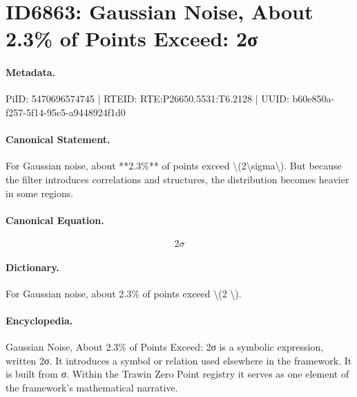 \section*{ID6863: Gaussian Noise, About 2.3\% of Points Exceed: 2σ}
\paragraph{Metadata.}
PiID: 5470696574745 | RTEID: RTE:P26650.5531:T6.2128 | UUID: b60e850a-f257-5f14-95c5-a9448924f1d0

\paragraph{Canonical Statement.}
For Gaussian noise, about **2.3\%** of points exceed \textbackslash{}(2\textbackslash{}sigma\textbackslash{}). But because the filter introduces correlations and structures, the distribution becomes heavier in some regions.

\paragraph{Canonical Equation.}
\[
2\sigma
\]

\paragraph{Dictionary.}
For Gaussian noise, about 2.3\% of points exceed \textbackslash{}(2 \textbackslash{}).

\paragraph{Encyclopedia.}
Gaussian Noise, About 2.3\% of Points Exceed: 2σ is a symbolic expression, written 2σ. It introduces a symbol or relation used elsewhere in the framework. It is built from σ. Within the Trawin Zero Point registry it serves as one element of the framework's mathematical narrative.
